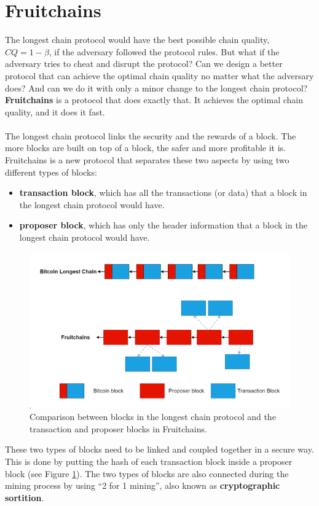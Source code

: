 \section{Fruitchains}
The longest chain protocol would have the best possible chain quality, $CQ = 1 - \beta$, if the adversary followed the protocol rules. But what if the adversary tries to cheat and disrupt the protocol? Can we design a better protocol that can achieve the optimal chain quality no matter what the adversary does? And can we do it with only a minor change to the longest chain protocol?\\ \textbf{Fruitchains} is a protocol that does exactly that. It achieves the optimal chain quality, and it does it fast.\\\\
The longest chain protocol links the security and the rewards of a block. The more blocks are built on top of a block, the safer and more profitable it is. Fruitchains is a new protocol that separates these two aspects by using two different types of blocks:
\begin{itemize}
    \item \textbf{transaction block}, which has all the transactions (or data) that a block in the longest chain protocol would have.
    \item \textbf{proposer block}, which has only the header information that a block in the longest chain protocol would have.
\end{itemize}
\begin{figure}[h!]
    \centering
    \includegraphics[width=0.7\linewidth]{Fig/07/F4}
    \caption{Comparison between blocks in the longest chain protocol and the transaction and proposer
        blocks in Fruitchains.}
    \label{fig:f4}
\end{figure}

These two types of blocks need to be linked and coupled together in a secure way. This is done by putting the hash of each transaction block inside a proposer block (see Figure \ref{fig:f4}). The two types of blocks are also connected during the mining process by using “2 for 1 mining”, also known as \textbf{cryptographic sortition}.

